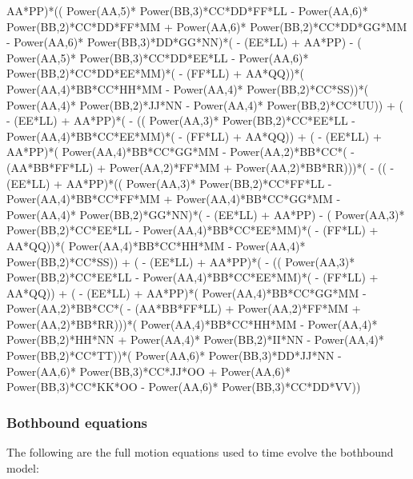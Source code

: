 \documentclass[10pt]{article} %
\begin{document}
{AA*PP)*(( Power(AA,5)* Power(BB,3)*CC*DD*FF*LL -  Power(AA,6)* Power(BB,2)*CC*DD*FF*MM +  Power(AA,6)* Power(BB,2)*CC*DD*GG*MM -  Power(AA,6)* Power(BB,3)*DD*GG*NN)*( - (EE*LL) + AA*PP) - ( Power(AA,5)* Power(BB,3)*CC*DD*EE*LL -  Power(AA,6)* Power(BB,2)*CC*DD*EE*MM)*( - (FF*LL) + AA*QQ))*( Power(AA,4)*BB*CC*HH*MM -  Power(AA,4)* Power(BB,2)*CC*SS))*( Power(AA,4)* Power(BB,2)*JJ*NN -  Power(AA,4)* Power(BB,2)*CC*UU)) + ( - (EE*LL) + AA*PP)*( - (( Power(AA,3)* Power(BB,2)*CC*EE*LL -  Power(AA,4)*BB*CC*EE*MM)*( - (FF*LL) + AA*QQ)) + ( - (EE*LL) + AA*PP)*( Power(AA,4)*BB*CC*GG*MM -  Power(AA,2)*BB*CC*( - (AA*BB*FF*LL) +  Power(AA,2)*FF*MM +  Power(AA,2)*BB*RR)))*( - (( - (EE*LL) + AA*PP)*(( Power(AA,3)* Power(BB,2)*CC*FF*LL -  Power(AA,4)*BB*CC*FF*MM +  Power(AA,4)*BB*CC*GG*MM -  Power(AA,4)* Power(BB,2)*GG*NN)*( - (EE*LL) + AA*PP) - ( Power(AA,3)* Power(BB,2)*CC*EE*LL -  Power(AA,4)*BB*CC*EE*MM)*( - (FF*LL) + AA*QQ))*( Power(AA,4)*BB*CC*HH*MM -  Power(AA,4)* Power(BB,2)*CC*SS)) + ( - (EE*LL) + AA*PP)*( - (( Power(AA,3)* Power(BB,2)*CC*EE*LL -  Power(AA,4)*BB*CC*EE*MM)*( - (FF*LL) + AA*QQ)) + ( - (EE*LL) + AA*PP)*( Power(AA,4)*BB*CC*GG*MM -  Power(AA,2)*BB*CC*( - (AA*BB*FF*LL) +  Power(AA,2)*FF*MM +  Power(AA,2)*BB*RR)))*( Power(AA,4)*BB*CC*HH*MM -  Power(AA,4)* Power(BB,2)*HH*NN +  Power(AA,4)* Power(BB,2)*II*NN -  Power(AA,4)* Power(BB,2)*CC*TT))*( Power(AA,6)* Power(BB,3)*DD*JJ*NN -  Power(AA,6)* Power(BB,3)*CC*JJ*OO +  Power(AA,6)* Power(BB,3)*CC*KK*OO -  Power(AA,6)* Power(BB,3)*CC*DD*VV))
}

\subsubsection{Bothbound equations}
\label{bothbound-motion-equations}
The following are the full motion equations used to time evolve the bothbound model:
\end{document}
